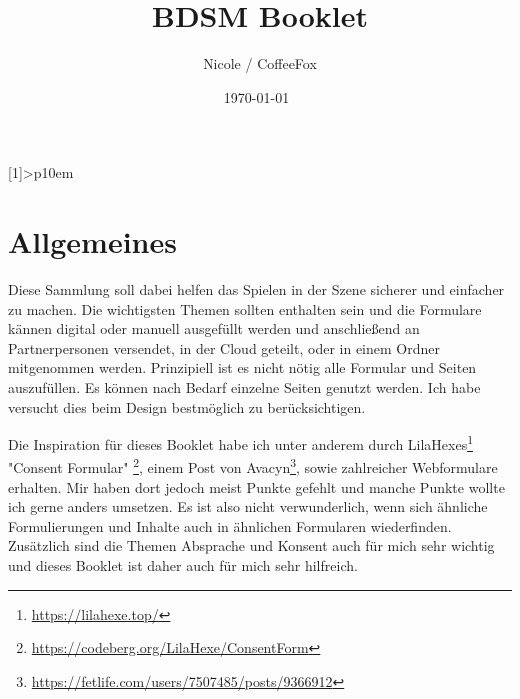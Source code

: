\documentclass[a4paper,12pt]{article}
\begin{document}
\setlength\dashlinedash{0.2pt}
\setlength\dashlinegap{1.5pt}
\setlength\arrayrulewidth{0.3pt}
\newcolumntype{P}[1]{>{\centering\arraybackslash}p{10em}}


\title{BDSM Booklet}
\author{Nicole / CoffeeFox}
\date{\today \ \currenttime \bigbreak {}}
\renewcommand*\contentsname{Inhaltsverzeichnis}

\pagestyle{fancy}
\fancyhead{} %
\fancyfoot{} %
\fancyfoot[LE,RO]{\thepage}


\maketitle
\tableofcontents
\newpage


\section{Allgemeines}
Diese Sammlung soll dabei helfen das Spielen in der Szene sicherer und einfacher zu machen. Die wichtigsten Themen sollten enthalten sein und die Formulare kännen digital oder manuell ausgefüllt werden und anschließend an Partnerpersonen versendet, in der Cloud geteilt, oder in einem Ordner mitgenommen werden. Prinzipiell ist es nicht nötig alle Formular und Seiten auszufüllen. Es können nach Bedarf einzelne Seiten genutzt werden. Ich habe versucht dies beim Design bestmöglich zu berücksichtigen.\bigbreak

Die Inspiration für dieses Booklet habe ich unter anderem durch LilaHexes\footnote{\url{https://lilahexe.top/}} "Consent Formular" \footnote{\url{https://codeberg.org/LilaHexe/ConsentForm}}, einem Post von Avacyn\footnote{\url{https://fetlife.com/users/7507485/posts/9366912}}, sowie zahlreicher Webformulare erhalten. Mir haben dort jedoch meist Punkte gefehlt und manche Punkte wollte ich gerne anders umsetzen. Es ist also nicht verwunderlich, wenn sich ähnliche Formulierungen und Inhalte auch in ähnlichen Formularen wiederfinden. Zusätzlich sind die Themen Absprache und Konsent auch für mich sehr wichtig und dieses Booklet ist daher auch für mich sehr hilfreich. \bigbreak
\end{document}
